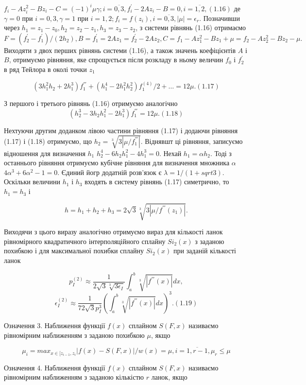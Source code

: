 \documentclass[ukrainian,14pt]{extarticle}
\begin{document}
$f_i - Az_i^2 - Bz_i - C = (-1)^i \mu \gamma; i = \overline{0, 3}, f^'_i - 2Az_i - B = 0, i = \overline{1,2}, (1.16)$
де $\gamma = 0$ при $i = 0, 3, \gamma = 1$ при $i = 1,2; f_i = f(z_i), i = \overline{0, 3}, |\mu| = \epsilon_r$. Позначивши через $h_1 = z_1 - z_0, h_2 = z_2 - z_1, h_3 = z_3 - z_2$, з системи рівнянь (1.16) отримаємо
$$F = (f^{'}_2 - f^{'}_1) / (2h_2), B = f^'_1 = 2Az_1 = f^'_2 - 2Az_2, C = f_1 - Az_1^2 - Bz_1 + \mu = f_2 - Az_2^2 - Bz_2 - \mu.$$
Виходяти з двох перших рівнянь системи (1.16), а також значень коефіцієнтів $A$ і $B$, отримуємо рівняння, яке спрощується після розкладу в ньому величин $f_0$ і $f^'_2$ в ряд Тейлора в околі точки $z_1$


$$(3h_1^2 h_2 + 2h_1^3)f^{'''}_1 + (h_1^4 - 2h_1^2 h_2^2) f^{(4)}_1 / 2 + \ldots = 12 \mu. (1.17)$$

З першого і третього рівнянь (1.16) отримуємо аналогічно
$$(h_2^3 - 3h_2h_1^2 - 2h_1^3)f^{'''}_1 = 12\mu. (1.18)$$

Нехтуючи другим доданком лівою частини рівняння (1.17) і додаючи рівняння (1.17) і (1.18) отримуємо, що $h_2 = \sqrt[3]{3|\mu/f^{'''}_1|}$. Віднявшт ці рівняння, записуємо відношення для визначення $h_1$ $h_2^4 - 6h_2 h_1^2 - 4h_1^3 = 0$. Нехай $h_1 = \alpha h_2$. Тоді з останнього рівняння отримуємо кубічне рівняння для визначення множника $\alpha$ $4\alpha^3 + 6\alpha^2 - 1 = 0$. Єдиний йогр додатній розв'язок є $\lambda = 1 / (1 + sqrt{3})$. Оскільки величини $h_1$ і $h_3$ входять в систему рівнянь (1.17) симетрично, то $h_1 = h_3$ і 

$$h = h_1 + h_2 + h_3 = 2 \sqrt{3} \sqrt[3]{3|\mu/f^{'''}(z_1)|}.$$

Виходячи з цього виразу аналогічно отримуємо вираз для кількості ланок рівномірного квадратичного інтерполяційного сплайну $Si_2(x)$ з заданою похибкою і для максимальної похибки сплайну $Si_2(x)$ при заданій кількості ланок

$$p_I^{(2)} \approx \frac{1}{2\sqrt{3} \sqrt[3]{3\epsilon_I}} \int_a^b \sqrt[3]{|f^{'''}(x)|}dx,$$
$$\epsilon_I^{(2)} \approx \frac{1}{72 \sqrt{3} p_I^{3}} \left(\int_a^b \sqrt[3]{|f^{'''}(x)|}dx \right)^3. (1.19)$$




\newpage
Означення 3. Наближення функції $f(x)$ сплайном $S(F, x)$ називаємо рівномірним наближенням з заданою похибкою $\mu$, якщо

$$\mu_i = max_{x \in [z_{i-1}, z_i} |f(x) - S(F, x)|/ w(x) = \mu, i = \overline{1, r-1}, \mu_r \leq \mu$$

Означення 4. Наближення функції $f(x)$ сплайном $S(F, x)$ називаємо рівномірним наближенням з заданою кількістю $r$ ланок, якщо
\end{document}

